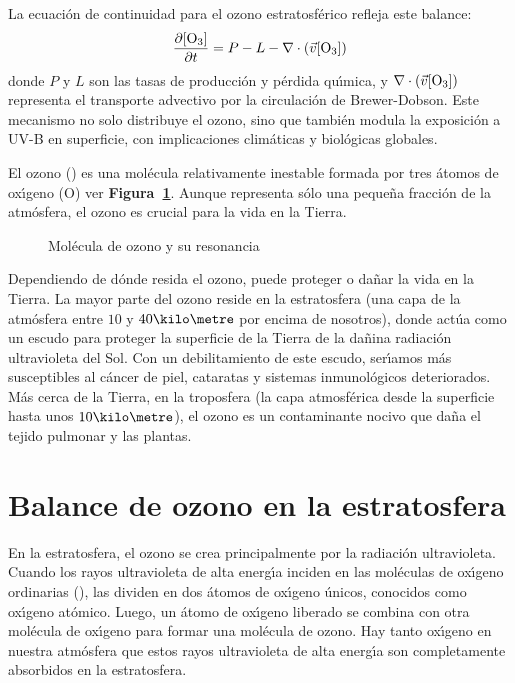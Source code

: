 La ecuaci\'on de continuidad para el ozono estratosf\'erico refleja este balance:
\begin{equation}
\frac{\partial [\ce{O3}]}{\partial t} = P - L - \nabla \cdot (\vec{v}[\ce{O3}])
\end{equation}
donde \( P \) y \( L \) son las tasas de producci\'on y p\'erdida qu\'{\i}mica, y \( \nabla \cdot (\vec{v}[\ce{O3}]) \) representa el transporte advectivo por la circulaci\'on de Brewer-Dobson. Este mecanismo no solo distribuye el ozono, sino que tambi\'en modula la exposici\'on a UV-B en superficie, con implicaciones clim\'aticas y biol\'ogicas globales.

El ozono () es una mol\'ecula relativamente inestable formada por tres \'atomos de ox\'{\i}geno (O) ver \textbf{Figura~\ref{reso3}}. Aunque representa s\'olo una peque\~na fracci\'on de la atm\'osfera, el ozono es crucial para la vida en la Tierra.
\begin{figure}[htbp]
\begin{center}
\caption{Mol\'ecula de ozono y su resonancia}
\label{reso3}
\end{center}
\end{figure}


Dependiendo de d\'onde resida el ozono, puede proteger o da\~nar la vida en la Tierra. La mayor parte del ozono reside en la estratosfera (una capa de la atm\'osfera entre $10$ y $40\kilo\metre$  por encima de nosotros), donde act\'ua como un escudo para proteger la superficie de la Tierra de la da\~nina radiaci\'on ultravioleta del Sol. Con un debilitamiento de este escudo, ser\'{\i}amos m\'as susceptibles al c\'ancer de piel, cataratas y sistemas inmunol\'ogicos deteriorados. M\'as cerca de la Tierra, en la troposfera (la capa atmosf\'erica desde la superficie hasta unos $10\kilo\metre$), el ozono es un contaminante nocivo que da\~na el tejido pulmonar y las plantas.

\section{Balance de ozono en la estratosfera}\label{oestra}

En la estratosfera, el ozono se crea principalmente por la radiaci\'on ultravioleta. Cuando los rayos ultravioleta de alta energ\'{\i}a inciden en las mol\'eculas de ox\'{\i}geno ordinarias (), las dividen en dos \'atomos de ox\'{\i}geno \'unicos, conocidos como ox\'{\i}geno at\'omico.
 Luego, un \'atomo de ox\'{\i}geno liberado se combina con otra mol\'ecula de ox\'{\i}geno para formar una mol\'ecula de ozono. Hay tanto ox\'{\i}geno en nuestra atm\'osfera que estos rayos ultravioleta de alta energ\'{\i}a son completamente absorbidos en la estratosfera.


